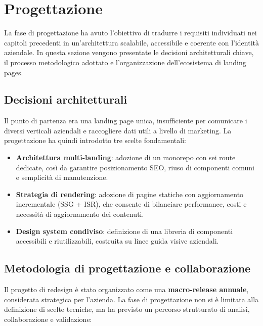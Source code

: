 \chapter{Progettazione}

La fase di progettazione ha avuto l’obiettivo di tradurre i requisiti individuati
nei capitoli precedenti in un’architettura scalabile, accessibile e coerente con
l’identità aziendale. In questa sezione vengono presentate le decisioni
architetturali chiave, il processo metodologico adottato e l’organizzazione
dell’ecosistema di landing pages.

\section{Decisioni architetturali}
Il punto di partenza era una landing page unica, insufficiente per comunicare i
diversi verticali aziendali e raccogliere dati utili a livello di marketing. La
progettazione ha quindi introdotto tre scelte fondamentali:

\begin{itemize}
  \item \textbf{Architettura multi-landing}: adozione di un monorepo con sei
  route dedicate, così da garantire posizionamento SEO, riuso di componenti
  comuni e semplicità di manutenzione.
  \item \textbf{Strategia di rendering}: adozione di pagine statiche con
  aggiornamento incrementale (SSG + ISR), che consente di bilanciare performance,
  costi e necessità di aggiornamento dei contenuti.
  \item \textbf{Design system condiviso}: definizione di una libreria di
  componenti accessibili e riutilizzabili, costruita su linee guida visive
  aziendali.
\end{itemize}

\section{Metodologia di progettazione e collaborazione}
Il progetto di redesign è stato organizzato come una \textbf{macro-release annuale},
considerata strategica per l’azienda. La fase di progettazione non si è limitata
alla definizione di scelte tecniche, ma ha previsto un percorso strutturato di
analisi, collaborazione e validazione:

